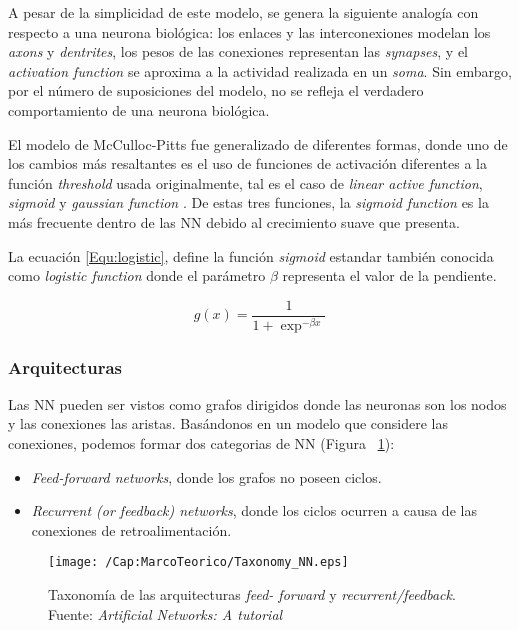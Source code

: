 A pesar de la simplicidad de este modelo, se genera la siguiente analogía con 
respecto a una neurona biológica: los enlaces y las interconexiones modelan 
los \textit{axons} y \textit{dentrites}, los pesos de las conexiones 
representan las \textit{synapses}, y el \textit{activation function} se 
aproxima a la actividad realizada en un \textit{soma}. Sin embargo, por el 
número de suposiciones del modelo, no se refleja el verdadero comportamiento 
de una neurona biológica.

El modelo de McCulloc-Pitts fue generalizado de diferentes formas, donde uno
de los cambios más resaltantes es el uso de funciones de activación diferentes
a la función \textit{threshold} usada originalmente, tal es el caso de 
\textit{linear active function}, \textit{sigmoid} y \textit{gaussian function}
. De estas tres funciones, la \textit{sigmoid function} \cite{Han:1995:TIofSF}
es la más frecuente dentro de las NN debido al crecimiento suave que presenta. 

La ecuación \ref{Equ:logistic}, define la función \textit{sigmoid} estandar
también conocida como \textit{logistic function} donde el parámetro $\beta$
representa el valor de la pendiente.

\begin{equation}
g(x) = \frac{1}{1 + \exp^{-\beta x}}
\label{Equ:logistic}
\end{equation}

\subsubsection{Arquitecturas}
Las NN pueden ser vistos como grafos dirigidos donde las neuronas son los
nodos y las conexiones las aristas. Basándonos en un modelo que considere las 
conexiones, podemos formar dos categorias de NN (Figura~
\ref{Fig:cap-marcoteorico:TaxonomyNN}):
\begin{itemize}
  \item \textit{Feed-forward networks}, donde los grafos no poseen ciclos.
  \item \textit{Recurrent (or feedback) networks}, donde los ciclos ocurren a 
  causa de las conexiones de retroalimentación.
\end{itemize}

\begin{figure}[h]
  \centering
  \texttt{[image: /Cap:MarcoTeorico/Taxonomy\_NN.eps]}
  \caption[Taxonomía de las arquitecturas \textit{feed-forward} y 
  \textit{recurrent/feedback}]{Taxonomía de las arquitecturas \textit{feed-
  forward} y \textit{recurrent/feedback}.\\ \centering\tiny{Fuente: 
  \textit{Artificial Networks: A tutorial}\citep{Jain:1996:ANN-AT}}}
  \label{Fig:cap-marcoteorico:TaxonomyNN}
\end{figure}


